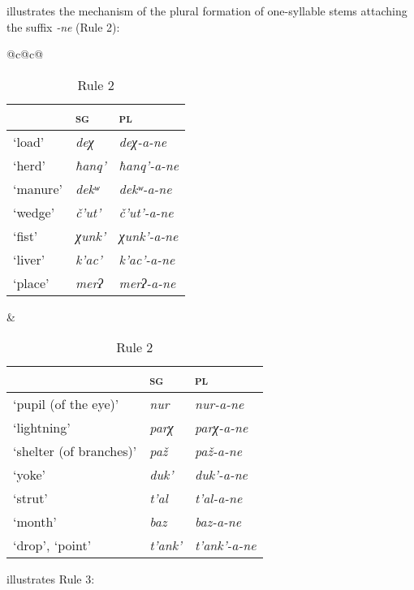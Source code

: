 ﻿\documentclass[output=paper]{langsci/langscibook}
\begin{document}
 illustrates the mechanism of the plural formation of
one-syllable stems attaching the suffix \emph{-ne} (Rule 2):

\begin{table}
  \caption{Rule 2}\label{tab:3:7} %

  \begin{tabular}{@{}c@{\qquad}c@{}}
    \toprule
  \begin{tabular}{@{}lll@{}}  
& \textsc{sg} & \textsc{pl}\tabularnewline \midrule %
`load' & \emph{deχ} & \emph{deχ-a-ne}\tabularnewline
`herd' & \emph{ħanq'} & \emph{ħanq'-a-ne}\tabularnewline
`manure' & \emph{dekʷ} & \emph{dekʷ-a-ne}\tabularnewline
`wedge' & \emph{č'ut'} & \emph{č'ut'-a-ne}\tabularnewline
`fist' & \emph{χunk'} & \emph{χunk'-a-ne}\tabularnewline
 `liver' & \emph{k'ac'} & \emph{k'ac'-a-ne}\tabularnewline %
 `place' & \emph{merʔ} & \emph{merʔ-a-ne}\tabularnewline
 \end{tabular} &
 \begin{tabular}{@{}lll@{}}  
& \textsc{sg} & \textsc{pl}\tabularnewline \midrule %
`pupil (of the eye)' & \emph{nur} & \emph{nur-a-ne}\tabularnewline %
`lightning' & \emph{parχ} & \emph{parχ-a-ne}\tabularnewline
`shelter (of branches)' & \emph{paž} & \emph{paž-a-ne}\tabularnewline
`yoke' & \emph{duk'} & \emph{duk'-a-ne}\tabularnewline
`strut' & \emph{t'al} & \emph{t'al-a-ne}\tabularnewline
`month' & \emph{baz} & \emph{baz-a-ne}\tabularnewline
`drop', `point' & \emph{t'ank'} & \emph{t'ank'-a-ne}\tabularnewline
 \end{tabular} \tabularnewline
\bottomrule
\end{tabular}                                  
\end{table}

 
 illustrates Rule 3:
\end{document}
